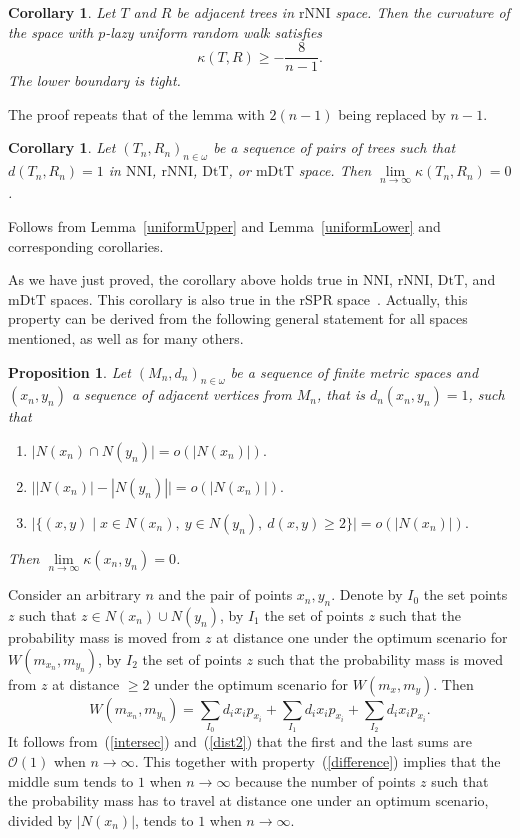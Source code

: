 \documentclass{amsart}
\newtheorem{proposition}[lemma]{Proposition}
\newtheorem{corollary}[lemma]{Corollary}
\newcommand{\dts}{\mathrm{DtT}}
\newcommand{\nni}{\mathrm{NNI}}
\newcommand{\rnni}{\mathrm{rNNI}}
\newcommand{\mdts}{\mathrm{mDtT}}
\renewcommand{\O}{\mathcal{O}}
\begin{document}
\begin{corollary}
Let $T$ and $R$ be adjacent trees in $\rnni$ space. 
Then the curvature of the space with $p$-lazy uniform random walk satisfies
\[
\kappa(T,R) \geq -\frac{8}{n-1}.
\]
The lower boundary is tight.
\end{corollary}

\proof
The proof repeats that of the lemma with $2(n-1)$ being replaced by $n-1$. 
\endproof

\begin{corollary}\label{flatInLimDTS}
Let $(T_n,R_n)_{n\in\omega}$ be a sequence of pairs of trees such that
$d(T_n,R_n) = 1$ in $\nni$, $\rnni$, $\dts$, or $\mdts$ space.
Then $\lim\limits_{n \to \infty}\kappa(T_n,R_n) = 0$.
\end{corollary}

\proof
Follows from Lemma~\ref{uniformUpper} and Lemma~\ref{uniformLower} and corresponding corollaries.
\endproof

As we have just proved, the corollary above holds true in $\nni$, $\rnni$, $\dts$, and $\mdts$ spaces. 
This corollary is also true in the rSPR space~\cite{Whidden2015-es}.
Actually, this property can be derived from the following general statement for all spaces mentioned, as well as for many others. 

\begin{proposition}\label{flatInLimGen}
Let $(M_n,d_n)_{n \in \omega}$ be a sequence of finite metric spaces and 
$(x_n, y_n)$ a sequence of adjacent vertices from $M_n$, 
that is $d_n(x_n,y_n) = 1$, such that 
\begin{enumerate}[(1)]
\item\label{intersec} $\big|N(x_n) \cap N(y_n)\big| = o(|N(x_n)|).$ 
\item\label{difference} $\big||N(x_n)| - |N(y_n)|\big| = o(|N(x_n)|).$ 
\item\label{dist2} $\big|\{(x,y) \mid 
	x \in N(x_n),~ y \in N(y_n),~ d(x, y) \geq 2\}\big| = o(|N(x_n)|).$
\end{enumerate}

Then $\lim\limits_{n \to \infty} \kappa(x_n, y_n) = 0$. 
\end{proposition}

\proof
Consider an arbitrary $n$ and the pair of points $x_n,y_n$. Denote by $I_0$ the
set points $z$ such that $z \in N(x_n) \cup N(y_n)$, by $I_1$ the set of points
$z$ such that the probability mass is moved from $z$ at distance one under the
optimum scenario for $W(m_{x_n},m_{y_n})$, by $I_2$ the set of points $z$ such that 
the probability mass is moved from $z$ at distance $\geq 2$ under the optimum 
scenario for $W(m_x,m_y)$. Then 
\[
W(m_{x_n},m_{y_n}) = \sum_{I_0} d_i x_i p_{x_i} + \sum_{I_1} d_i x_i p_{x_i} + 
\sum_{I_2} d_i x_i p_{x_i}.
\]
It follows from~(\ref{intersec}) and~(\ref{dist2}) that the first and the last sums
are $\O(1)$ when $n\to\infty$. This together with property~(\ref{difference}) 
implies that the middle sum tends to $1$ when $n\to\infty$ because the number of
points $z$ such that the probability mass has to travel at distance one under an
optimum scenario, divided by $|N(x_n)|$, tends to $1$ when $n\to\infty$. 
\endproof
\end{document}
